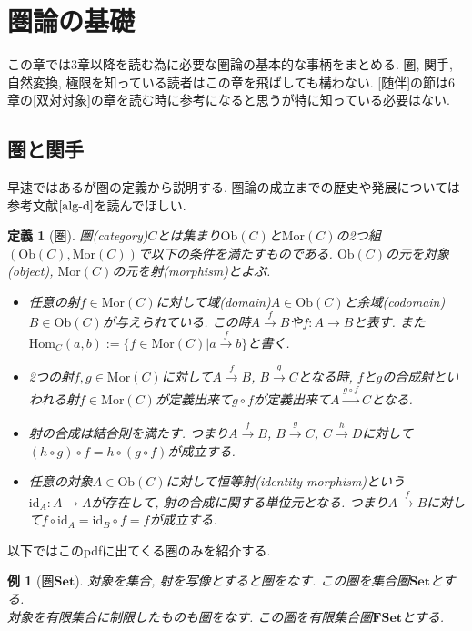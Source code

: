 \documentclass[a4paper,12pt]{ltjsarticle}
\theoremstyle{break}
\newtheorem{defn}[thm]{定義}
\newtheorem{eg}[thm]{例}
\newcommand{\cset}{\mathbf{Set}}
\newcommand{\fset}{\mathbf{FSet}}
\newcommand{\Ob}{\mathrm{Ob}}
\newcommand{\Mor}{\mathrm{Mor}}
\newcommand{\Hom}{\mathrm{Hom}}
\newcommand{\xr}[1]{\xrightarrow{#1}}
\newcommand{\id}{\mathrm{id}}
\numberwithin{equation}{section}
\begin{document}
\newpage

\tableofcontents

\newpage

\section{圏論の基礎}

この章では3章以降を読む為に必要な圏論の基本的な事柄をまとめる. 
圏, 関手, 自然変換, 極限を知っている読者はこの章を飛ばしても構わない. 
[随伴]の節は6章の[双対対象]の章を読む時に参考になると思うが特に知っている必要はない. 

\subsection{圏と関手}

早速ではあるが圏の定義から説明する. 
圏論の成立までの歴史や発展については参考文献$\cite{alg-d}$を読んでほしい.

\begin{defn}[圏]
  圏(category)$C$とは集まり$\Ob(C)$と$\Mor(C)$の2つ組$(\Ob(C),\Mor(C))$で以下の条件を満たすものである. 
  $\Ob(C)$の元を対象(object), $\Mor(C)$の元を射(morphism)とよぶ. 
  \begin{itemize}
    \item 任意の射$f \in \Mor(C)$に対して域(domain)$A \in \Ob(C)$と余域(codomain)$B \in \Ob(C)$が与えられている. 
    この時$A \xr{f} B$や$f: A \to B$と表す. 
    また$\Hom_C(a,b) := \{f \in \Mor(C) | a \xr{f} b \}$と書く.  
    \item 2つの射$f, g \in \Mor(C)$に対して$A \xr{f} B$, $B \xr{g} C$となる時, $f$と$g$の合成射といわれる射$f \in \Mor(C)$が定義出来て$g \circ f$が定義出来て$A \xr{g \circ f} C$となる. 
    \item 射の合成は結合則を満たす. つまり$A \xr{f} B$, $B \xr{g} C$, $C \xr{h} D$に対して$(h \circ g) \circ f = h \circ (g \circ f)$が成立する. 
    \item 任意の対象$A \in \Ob(C)$に対して恒等射(identity morphism)という$\id_A: A \to A$が存在して, 射の合成に関する単位元となる. つまり$A \xr{f} B$に対して$f \circ \id_A = \id_B \circ f = f$が成立する. 
  \end{itemize}
\end{defn}

以下ではこのpdfに出てくる圏のみを紹介する. 

\begin{eg}[圏$\cset$]
  対象を集合, 射を写像とすると圏をなす. 
  この圏を集合圏$\cset$とする. \\
  対象を有限集合に制限したものも圏をなす. 
  この圏を有限集合圏$\fset$とする. 
\end{eg}  
\end{document}
